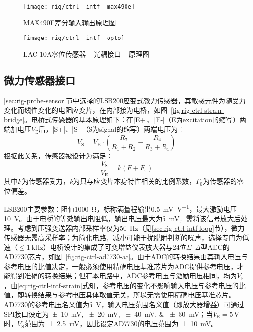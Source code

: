 
\begin{figure}[p]
\centering
\texttt{[image: rig/ctrl\_\_intf\_\_max490e]}
\caption{MAX490E差分输入输出原理图}
\label{fig:rig-ctrl-intf-max490e}
\end{figure}

\begin{figure}[p]
\centering
\texttt{[image: rig/ctrl\_\_intf\_\_opto]}
\caption{LAC-10A零位传感器 -- 光耦接口 -- 原理图}
\label{fig:rig-ctrl-intf-opto}
\end{figure}

\subsection{微力传感器接口}\label{sec:rig-ctrl-intf-strain}

\ref{sec:rig-probe-sensor}节中选择的LSB200应变式微力传感器，其敏感元件为随受力变化而线性变化的电阻应变片，在内部接为电桥，如图~\ref{fig:rig-ctrl-strain-bridge}。电桥式传感器的基本原理如下：在\bverb|E+|、\bverb|E-|（E为excitation的缩写）两端加电压$V_{\mathrm{E}}$后，\bverb|S+|、\bverb|S-|（S为signal的缩写）两端电压为：
\[
V_{\mathrm{S}} = V_{\mathrm{E}} \cdot (\frac{R_2}{R_1 + R_2} - \frac{R_4}{R_3 + R_4})
\]
根据此关系，传感器被设计为满足：
\begin{equation}
\label{eq:rig-ctrl-intf-strain}
\frac{V_{\mathrm{S}}}{V_{\mathrm{E}}} = k (F + F_0)
\end{equation}
其中$F$为传感器受力，$k$为只与应变片本身特性相关的比例系数，$F_0$为传感器的零位偏差。

LSB200主要参数：阻值\SI{1000}{\ohm}，标称满量程输出\SI{0.5}{\mV\per\V}，最大激励电压\SI{10}{\V}。由于电桥的等效输出电阻低，输出电压最大为\SI{5}{\mV}，需将该信号放大后处理。考虑到压强变送器内部采样率仅为\SI{50}{\Hz}（见\ref{sec:rig-ctrl-intf-loop}节），微力传感器无需高采样率；为简化电路，减小可能干扰脱附判断的噪声，选择专门为低速（$\leq\SI{1}{\kHz}$）电桥设计的集成了可变增益仪表放大器与24位$\Sigma$--$\Delta$型ADC的AD7730芯片，如图~\ref{fig:rig-ctrl-ad7730-ac}。由于ADC的转换结果由其输入电压与参考电压的比值决定，一般必须使用精确电压基准芯片为ADC提供参考电压，才能得到准确的转换结果；但在本电路中，ADC参考电压与激励电压相同，均为$V_{\mathrm{E}}$，由\eqref{eq:rig-ctrl-intf-strain}式知，参考电压的变化不影响输入电压与参考电压的比值，即转换结果与参考电压具体取值无关，所以无需使用精确电压基准芯片。AD7730的参考电压名义值为\SI{5}{\V}，输入电压范围名义值（即放大器增益）可通过SPI接口设定为\SIlist[list-separator={、},list-final-separator={、或}]{\pm 10;\pm 20;\pm 40;\pm 80}{\mV}；当$V_{\mathrm{E}} = \SI{5}{\V}$时，$V_{\mathrm{S}}$范围为\SI{\pm 2.5}{\mV}，因此设定AD7730的电压范围为\SI{\pm 10}{\mV}。


